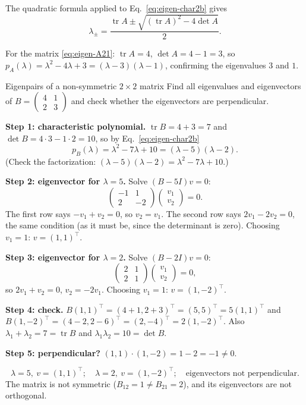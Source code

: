 The quadratic formula applied to Eq.~\eqref{eq:eigen-char2b} gives
\begin{equation}
\lambda_\pm=\frac{\operatorname{tr}A\pm\sqrt{(\operatorname{tr}A)^2-4\det A}}{2}.
\label{eq:eigen-quadratic}
\end{equation}

For the matrix \eqref{eq:eigen-A21}: $\operatorname{tr}A=4$, $\det A=4-1=3$, so $p_A(\lambda)=\lambda^2-4\lambda+3=(\lambda-3)(\lambda-1)$, confirming the eigenvalues $3$ and $1$.

\begin{sample}{Eigenpairs of a non-symmetric $2\times2$ matrix}
Find all eigenvalues and eigenvectors of $B=\begin{pmatrix}4&1\\2&3\end{pmatrix}$ and check whether the eigenvectors are perpendicular.

\textbf{Step 1: characteristic polynomial.} $\operatorname{tr}B=4+3=7$ and $\det B=4\cdot3-1\cdot2=10$, so by Eq.~\eqref{eq:eigen-char2b}
\[
p_B(\lambda)=\lambda^2-7\lambda+10=(\lambda-5)(\lambda-2).
\]
(Check the factorization: $(\lambda-5)(\lambda-2)=\lambda^2-7\lambda+10$.)

\textbf{Step 2: eigenvector for $\lambda=5$.} Solve $(B-5I)v=0$:
\[
\begin{pmatrix}-1&1\\2&-2\end{pmatrix}\begin{pmatrix}v_1\\v_2\end{pmatrix}=0.
\]
The first row says $-v_1+v_2=0$, so $v_2=v_1$. The second row says $2v_1-2v_2=0$, the same condition (as it must be, since the determinant is zero). Choosing $v_1=1$: $v=(1,1)^\top$.

\textbf{Step 3: eigenvector for $\lambda=2$.} Solve $(B-2I)v=0$:
\[
\begin{pmatrix}2&1\\2&1\end{pmatrix}\begin{pmatrix}v_1\\v_2\end{pmatrix}=0,
\]
so $2v_1+v_2=0$, $v_2=-2v_1$. Choosing $v_1=1$: $v=(1,-2)^\top$.

\textbf{Step 4: check.} $B(1,1)^\top=(4+1,2+3)^\top=(5,5)^\top=5(1,1)^\top$ and $B(1,-2)^\top=(4-2,2-6)^\top=(2,-4)^\top=2(1,-2)^\top$. Also $\lambda_1+\lambda_2=7=\operatorname{tr}B$ and $\lambda_1\lambda_2=10=\det B$.

\textbf{Step 5: perpendicular?} $(1,1)\cdot(1,-2)=1-2=-1\ne0$.

\[
\boxed{\lambda=5,\ v=(1,1)^\top;\quad \lambda=2,\ v=(1,-2)^\top;\quad\text{eigenvectors not perpendicular.}}
\]
The matrix is not symmetric ($B_{12}=1\ne B_{21}=2$), and its eigenvectors are not orthogonal.
\end{sample}

